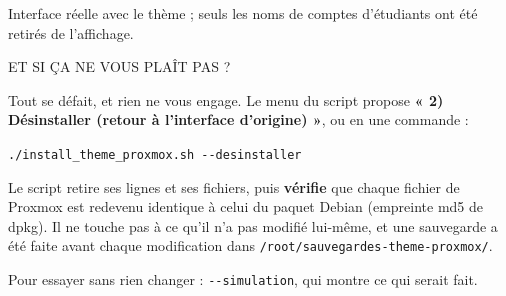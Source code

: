 \documentclass[9pt]{extarticle}
\begin{document}
{\small\color{gray}Interface réelle avec le thème ; seuls les noms de comptes d'étudiants ont été retirés de l'affichage.}

\vspace{6mm}
\begin{tcolorbox}[enhanced,colback=cyan!6,colframe=cyan!60!black,boxrule=0.8pt,arc=3pt,
                  left=8pt,right=8pt,top=6pt,bottom=6pt]
{\orbitron\fontsize{11}{13}\selectfont\color{cyan!55!black}ET SI ÇA NE VOUS PLAÎT PAS ?}\par\vspace{3mm}
\small Tout se défait, et rien ne vous engage. Le menu du script propose
\textbf{« 2) Désinstaller (retour à l'interface d'origine) »}, ou en une commande :\par
\vspace{2mm}
\hspace*{4mm}\texttt{./install\_theme\_proxmox.sh -{}-desinstaller}\par
\vspace{2mm}
Le script retire ses lignes et ses fichiers, puis \textbf{vérifie} que chaque fichier de Proxmox
est redevenu identique à celui du paquet Debian (empreinte md5 de dpkg). Il ne touche pas à ce
qu'il n'a pas modifié lui-même, et une sauvegarde a été faite avant chaque modification dans
\texttt{/root/sauvegardes-theme-proxmox/}.\par
\vspace{2mm}
Pour essayer sans rien changer : \texttt{-{}-simulation}, qui montre ce qui serait fait.
\end{tcolorbox}
\end{document}
